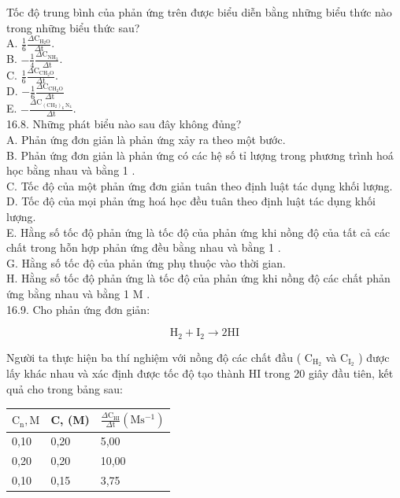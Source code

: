 \documentclass[10pt]{article}
\begin{document}
Tốc độ trung bình của phản ứng trên được biểu diễn bằng những biểu thức nào trong những biểu thức sau?\\
A. $\frac{1}{6} \frac{\Delta \mathrm{C}_{\mathrm{H}_{2} \mathrm{O}}}{\Delta \mathrm{t}}$.\\
B. $-\frac{1}{4} \frac{\Delta \mathrm{C}_{\mathrm{NH}_{3}}}{\Delta \mathrm{t}}$.\\
C. $\frac{1}{6} \frac{\Delta \mathrm{C}_{\mathrm{CH}_{2} \mathrm{O}}}{\Delta \mathrm{t}}$.\\
D. $-\frac{1}{6} \frac{\Delta \mathrm{C}_{\mathrm{CH}_{2} \mathrm{O}}}{\Delta \mathrm{t}}$\\
E. $-\frac{\Delta \mathrm{C}_{\left(\mathrm{CH}_{2}\right)_{6} \mathrm{~N}_{4}}}{\Delta \mathrm{t}}$.\\
16.8. Những phát biểu nào sau đây không đủng?\\
A. Phản ứng đơn giản là phản ứng xảy ra theo một bước.\\
B. Phản ứng đơn giản là phản ứng có các hệ số tỉ lượng trong phương trình hoá học bằng nhau và bằng 1 .\\
C. Tốc độ của một phản ứng đơn giản tuân theo định luật tác dụng khối lượng.\\
D. Tốc độ của mọi phản ứng hoá học đều tuân theo định luật tác dụng khối lượng.\\
E. Hằng số tốc độ phản ứng là tốc độ của phản ứng khi nồng độ của tất cả các chất trong hỗn hợp phản ứng đều bằng nhau và bằng 1 .\\
G. Hằng số tốc độ của phản ứng phụ thuộc vào thời gian.\\
H. Hằng số tốc độ phản ứng là tốc độ của phản ứng khi nồng độ các chất phản ứng bằng nhau và bằng 1 M .\\
16.9. Cho phản ứng đơn giản:

$$
\mathrm{H}_{2}+\mathrm{I}_{2} \rightarrow 2 \mathrm{HI}
$$

Người ta thực hiện ba thí nghiệm với nồng độ các chất đầu ( $\mathrm{C}_{\mathrm{H}_{2}}$ và $\mathrm{C}_{\mathrm{I}_{2}}$ ) được lấy khác nhau và xác định được tốc độ tạo thành HI trong 20 giây đầu tiên, kết quả cho trong bảng sau:

\begin{center}
\begin{tabular}{|l|l|l|}
\hline
$\mathrm{C}_{\mathrm{n}}, \mathrm{M}$ & C, (M) & $\frac{\Delta \mathrm{C}_{\mathrm{HI}}}{\Delta \mathrm{t}}\left(\mathrm{M} \mathrm{s}^{-1}\right)$ \\
\hline
0,10 & 0,20 & 5,00 \\
\hline
0,20 & 0,20 & 10,00 \\
\hline
0,10 & 0,15 & 3,75 \\
\hline
\end{tabular}
\end{center}
\end{document}
